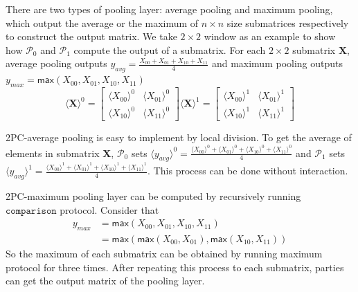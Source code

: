 \documentclass[letterpaper]{article} %
\begin{document}
    There are two types of pooling layer: average pooling and maximum pooling,
    which output the average or the maximum of $n\times n$ size submatrices respectively
    to construct the output matrix.
    We take $2\times 2$ window as an example to show how $\mathcal{P}_{0}$ and $\mathcal{P}_{1}$ compute the output of a submatrix.
    For each $2\times 2$ submatrix $\mathbf{X}$, average pooling outputs $y_{avg}=\frac{X_{00}+ X_{01}+ X_{10}+  X_{11}}{4}$
    and maximum pooling outputs $y_{max}=\mathsf{max}(X_{00}, X_{01}, X_{10},  X_{11})$
    $$  \langle \mathbf{X}\rangle ^{0}= \begin{bmatrix}
        \langle X_{00}\rangle ^{0}& \langle X_{01}\rangle ^{0} \\
        \langle X_{10}\rangle ^{0}& \langle X_{11}\rangle ^{0}
       \end{bmatrix}\langle \mathbf{X}\rangle ^{1}=\begin{bmatrix}
        \langle X_{00}\rangle ^{1}& \langle X_{01}\rangle ^{1} \\
        \langle X_{10}\rangle ^{1}& \langle X_{11}\rangle ^{1}
       \end{bmatrix}$$

    2PC-average pooling is easy to implement by local division.
    To get the average of elements in submatrix $\mathbf{X}$,
    $\mathcal{P}_{0}$ sets $\langle y_{avg}\rangle^{0} = \frac{\langle X_{00}\rangle ^{0}+ \langle X_{01}\rangle ^{0}+
    \langle X_{10}\rangle ^{0}+ \langle X_{11}\rangle ^{0}}{4}$ and
    $\mathcal{P}_{1}$ sets $\langle y_{avg}\rangle^{1} = \frac{\langle X_{00}\rangle ^{1}+ \langle X_{01}\rangle ^{1}+
    \langle X_{10}\rangle ^{1}+ \langle X_{11}\rangle ^{1}}{4}$. This process can be done without interaction.

    2PC-maximum pooling layer can be computed by recursively running $\mathtt{comparison}$ protocol.
    Consider that
    \begin{align*}
        y_{max} &= \mathsf{max}(X_{00}, X_{01}, X_{10}, X_{11}) \\
        &= \mathsf{max}(\mathsf{max}(X_{00},X_{01}),\mathsf{max}( X_{10}, X_{11}))
    \end{align*}
    So the maximum of each submatrix can be obtained by running
    maximum protocol for three times.
    After repeating this process to each submatrix, parties can get the output matrix of the pooling layer.
\end{document}
